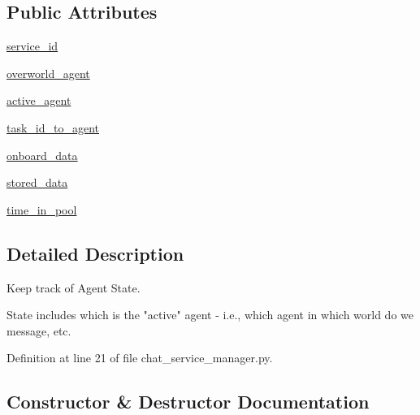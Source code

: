 \subsection*{Public Attributes}
\begin{DoxyCompactItemize}
\item 
\hyperlink{classparlai_1_1chat__service_1_1core_1_1chat__service__manager_1_1AgentState_ae81955487ddb55627cf08956490fb3a9}{service\+\_\+id}
\item 
\hyperlink{classparlai_1_1chat__service_1_1core_1_1chat__service__manager_1_1AgentState_a1780b29283e18b7b7e6d674ba5ea0907}{overworld\+\_\+agent}
\item 
\hyperlink{classparlai_1_1chat__service_1_1core_1_1chat__service__manager_1_1AgentState_a7a655f0e572d17c98d0651024a88799d}{active\+\_\+agent}
\item 
\hyperlink{classparlai_1_1chat__service_1_1core_1_1chat__service__manager_1_1AgentState_a1efa5479b623ca88b7f87499e614e805}{task\+\_\+id\+\_\+to\+\_\+agent}
\item 
\hyperlink{classparlai_1_1chat__service_1_1core_1_1chat__service__manager_1_1AgentState_a147489a82a99a94ea2b95aeb24113be7}{onboard\+\_\+data}
\item 
\hyperlink{classparlai_1_1chat__service_1_1core_1_1chat__service__manager_1_1AgentState_afd5dec08a8a550c3bedff7a6cfb38307}{stored\+\_\+data}
\item 
\hyperlink{classparlai_1_1chat__service_1_1core_1_1chat__service__manager_1_1AgentState_aa4fbf177376f8de421cc02841365b0df}{time\+\_\+in\+\_\+pool}
\end{DoxyCompactItemize}


\subsection{Detailed Description}
\begin{DoxyVerb}Keep track of Agent State.

State includes which is the "active" agent - i.e., which agent in which
world do we message, etc.
\end{DoxyVerb}
 

Definition at line 21 of file chat\+\_\+service\+\_\+manager.\+py.



\subsection{Constructor \& Destructor Documentation}
\mbox{\label{classparlai_1_1chat__service_1_1core_1_1chat__service__manager_1_1AgentState_a9b5a2611095c2f946898f1d77fa38f38}} 
